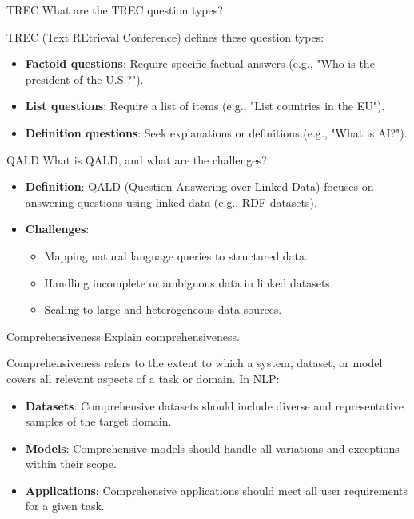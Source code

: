 \documentclass{article}
\begin{document}
\begin{exercise}{TREC}
  What are the TREC question types?

  \begin{solution}
    TREC (Text REtrieval Conference) defines these question types:
    \begin{itemize}
        \item \textbf{Factoid questions}: Require specific factual answers (e.g., "Who is the president of the U.S.?").
        \item \textbf{List questions}: Require a list of items (e.g., "List countries in the EU").
        \item \textbf{Definition questions}: Seek explanations or definitions (e.g., "What is AI?").
    \end{itemize}
  \end{solution}
\end{exercise}

\begin{exercise}{QALD}
  What is QALD, and what are the challenges?

  \begin{solution}
    \begin{itemize}
        \item \textbf{Definition}: QALD (Question Answering over Linked Data) focuses on answering questions using linked data (e.g., RDF datasets).
        \item \textbf{Challenges}:
        \begin{itemize}
            \item Mapping natural language queries to structured data.
            \item Handling incomplete or ambiguous data in linked datasets.
            \item Scaling to large and heterogeneous data sources.
        \end{itemize}
    \end{itemize}
  \end{solution}
\end{exercise}



\setcounter{section}{2020}

\begin{exercise}{Comprehensiveness}
  Explain comprehensiveness.

  \begin{solution}
    Comprehensiveness refers to the extent to which a system, dataset, or model covers all relevant aspects of a task or domain. In NLP:
    \begin{itemize}
        \item \textbf{Datasets}: Comprehensive datasets should include diverse and representative samples of the target domain.
        \item \textbf{Models}: Comprehensive models should handle all variations and exceptions within their scope.
        \item \textbf{Applications}: Comprehensive applications should meet all user requirements for a given task.
    \end{itemize}
  \end{solution}
\end{exercise}
\end{document}
